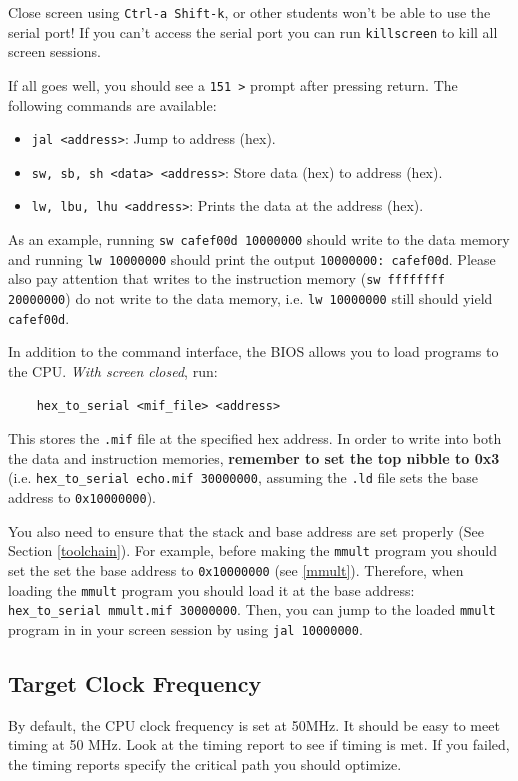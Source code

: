 \documentclass[11pt]{article}
\begin{document}
Close screen using \verb|Ctrl-a Shift-k|, or other students won't be able to use the serial port!
If you can't access the serial port you can run \verb|killscreen| to kill all screen sessions.

If all goes well, you should see a \verb|151 >| prompt after pressing return. The following commands are available:
\begin{itemize}
    \item \verb|jal <address>|: Jump to address (hex).
    \item \verb|sw, sb, sh <data> <address>|: Store data (hex) to address (hex).
    \item \verb|lw, lbu, lhu <address>|: Prints the data at the address (hex).
\end{itemize}

As an example, running \verb|sw cafef00d 10000000| should write to the data memory and running \verb|lw 10000000| should print the output \verb|10000000: cafef00d|.
Please also pay attention that writes to the instruction memory (\verb|sw ffffffff 20000000|) do not write to the data memory, i.e. \verb|lw 10000000| still should yield \verb|cafef00d|.

In addition to the command interface, the BIOS allows you to load programs to the CPU. \textit{With screen closed}, run:
\begin{verbatim}
    hex_to_serial <mif_file> <address>
\end{verbatim}

This stores the \verb|.mif| file at the specified hex address.
In order to write into both the data and instruction memories, \textbf{remember to set the top nibble to 0x3} (i.e. \verb|hex_to_serial echo.mif 30000000|, assuming the \verb|.ld| file sets the base address to \verb|0x10000000|).

You also need to ensure that the stack and base address are set properly (See Section \ref{toolchain}).
For example, before making the \verb|mmult| program you should set the set the base address to \verb|0x10000000| (see \ref{mmult}).
Therefore, when loading the \verb|mmult| program you should load it at the base address: \verb|hex_to_serial mmult.mif 30000000|.
Then, you can jump to the loaded \verb|mmult| program in in your screen session by using \verb|jal 10000000|.

\subsection{Target Clock Frequency}
By default, the CPU clock frequency is set at 50MHz.
It should be easy to meet timing at 50 MHz.
Look at the timing report to see if timing is met.
If you failed, the timing reports specify the critical path you should optimize.
\end{document}
